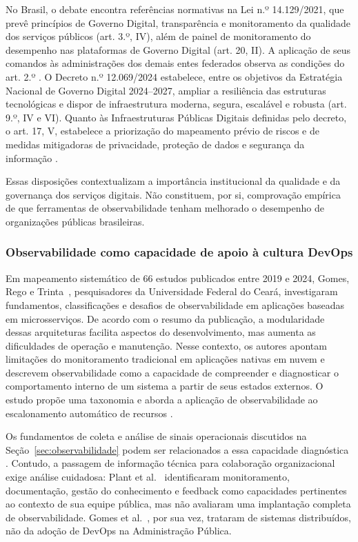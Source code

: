 No Brasil, o debate encontra referências normativas na Lei n.º 14.129/2021, que prevê princípios de Governo Digital, transparência e monitoramento da qualidade dos serviços públicos (art. 3.º, IV), além de painel de monitoramento do desempenho nas plataformas de Governo Digital (art. 20, II). A aplicação de seus comandos às administrações dos demais entes federados observa as condições do art. 2.º \cite{brasil2021}. O Decreto n.º 12.069/2024 estabelece, entre os objetivos da Estratégia Nacional de Governo Digital 2024--2027, ampliar a resiliência das estruturas tecnológicas e dispor de infraestrutura moderna, segura, escalável e robusta (art. 9.º, IV e VI). Quanto às Infraestruturas Públicas Digitais definidas pelo decreto, o art. 17, V, estabelece a priorização do mapeamento prévio de riscos e de medidas mitigadoras de privacidade, proteção de dados e segurança da informação \cite{brasil2024}.

Essas disposições contextualizam a importância institucional da qualidade e da governança dos serviços digitais. Não constituem, por si, comprovação empírica de que ferramentas de observabilidade tenham melhorado o desempenho de organizações públicas brasileiras.

\subsubsection{Observabilidade como capacidade de apoio à cultura DevOps}

Em mapeamento sistemático de 66 estudos publicados entre 2019 e 2024, Gomes, Rego e Trinta~, pesquisadores da Universidade Federal do Ceará, investigaram fundamentos, classificações e desafios de observabilidade em aplicações baseadas em microsserviços. De acordo com o resumo da publicação, a modularidade dessas arquiteturas facilita aspectos do desenvolvimento, mas aumenta as dificuldades de operação e manutenção. Nesse contexto, os autores apontam limitações do monitoramento tradicional em aplicações nativas em nuvem e descrevem observabilidade como a capacidade de compreender e diagnosticar o comportamento interno de um sistema a partir de seus estados externos. O estudo propõe uma taxonomia e aborda a aplicação de observabilidade ao escalonamento automático de recursos \cite{gomes2025}.

Os fundamentos de coleta e análise de sinais operacionais discutidos na Seção~\ref{sec:observabilidade} podem ser relacionados a essa capacidade diagnóstica \cite{kosinska2023,giamattei2024}. Contudo, a passagem de informação técnica para colaboração organizacional exige análise cuidadosa: Plant et al.~ identificaram monitoramento, documentação, gestão do conhecimento e feedback como capacidades pertinentes ao contexto de sua equipe pública, mas não avaliaram uma implantação completa de observabilidade. Gomes et al.~, por sua vez, trataram de sistemas distribuídos, não da adoção de DevOps na Administração Pública.

